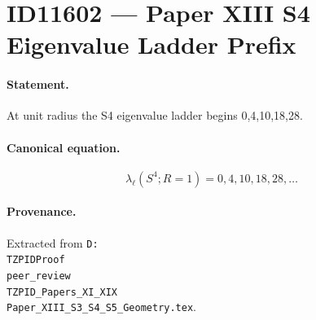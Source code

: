 \section*{ID11602 --- Paper XIII S4 Eigenvalue Ladder Prefix}

\paragraph{Statement.}
At unit radius the S4 eigenvalue ladder begins 0,4,10,18,28.

\paragraph{Canonical equation.}
\[
\lambda_\ell(S^4;R=1)=0,4,10,18,28,\ldots
\]

\paragraph{Provenance.}
Extracted from \texttt{D:\\TZPIDProof\\peer\_review\\TZPID\_Papers\_XI\_XIX\\Paper\_XIII\_S3\_S4\_S5\_Geometry.tex}.
